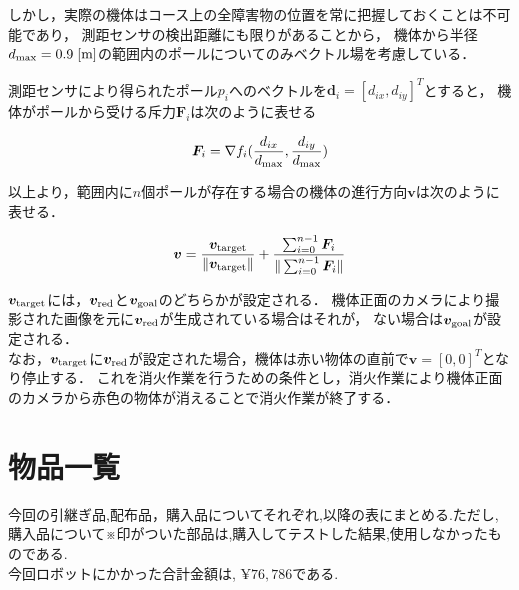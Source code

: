 \documentclass[11pt,a4]{jsarticle}
\begin{document}
  しかし，実際の機体はコース上の全障害物の位置を常に把握しておくことは不可能であり，
  測距センサの検出距離にも限りがあることから，
  機体から半径$d_{\rm{max}} = 0.9 \hspace{1mm}\mathrm{[m]}$の範囲内のポールについてのみベクトル場を考慮している．

  測距センサにより得られたポール$p_i$へのベクトルを$\bm{d}_i = [d_{ix}, d_{iy}]^{T}$とすると，
  機体がポールから受ける斥力$\bm{F}_i$は次のように表せる

  \begin{equation}
    \bm{F}_i = \nabla f_i(\frac{d_{ix}}{d_{\rm{max}}}, \frac{d_{iy}}{d_{\rm{max}}})
  \end{equation}

  以上より，範囲内に$n$個ポールが存在する場合の機体の進行方向$\bm{v}$は次のように表せる．

  \begin{equation}
    \bm{v} = \frac{\bm{v}_{\rm{target}}}{\|\bm{v}_{\rm{target}}\|} + \frac{\sum_{i=0}^{n-1}{\bm{F}_i}}{\|\sum_{i=0}^{n-1}{\bm{F}_i}\|}
  \end{equation}

  $\bm{v}_{\rm{target}}$には，$\bm{v}_{\rm{red}}$と$\bm{v}_{\rm{goal}}$のどちらかが設定される．
  機体正面のカメラにより撮影された画像を元に$\bm{v}_{\rm{red}}$が生成されている場合はそれが，
  ない場合は$\bm{v}_{\rm{goal}}$が設定される．\\

  なお，$\bm{v}_{\rm{target}}$に$\bm{v}_{\rm{red}}$が設定された場合，機体は赤い物体の直前で$\bm{v} = [0, 0]^{T}$となり停止する．
  これを消火作業を行うための条件とし，消火作業により機体正面のカメラから赤色の物体が消えることで消火作業が終了する．


\newpage
\section{物品一覧}
今回の引継ぎ品,配布品，購入品についてそれぞれ,以降の表にまとめる.ただし,購入品について※印がついた部品は,購入してテストした結果,使用しなかったものである.\\

今回ロボットにかかった合計金額は, $\yen 76,786$である.
\end{document}
